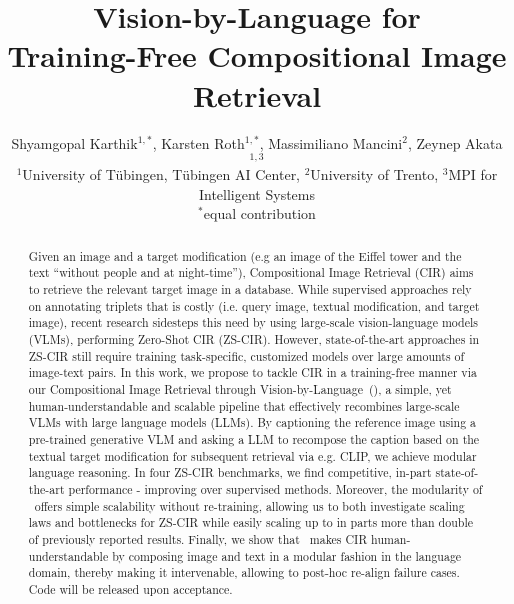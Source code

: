 \documentclass{article} \usepackage{iclr2024_conference,times}
\title{Vision-by-Language for \\Training-Free Compositional Image Retrieval}
\author{Shyamgopal Karthik$^{1,*}$, Karsten Roth$^{1,*}$, Massimiliano Mancini$^{2}$, Zeynep Akata$^{1, 3}$\\
\small{$^{1}$University of Tübingen, Tübingen AI Center, $^{2}$University of Trento, $^{3}$MPI for Intelligent Systems}\\
\small{$^*$equal contribution}
}
\newcommand{\acronym}{{Compositional Image Retrieval through Vision-by-Language}}
\begin{document}
\maketitle



\begin{abstract}
Given an image and a target modification (e.g an image of the Eiffel tower and the text ``without people and at night-time''), Compositional Image Retrieval (CIR) aims to retrieve the relevant target image in a database. While supervised approaches rely on annotating triplets that is costly (i.e. query image, textual modification, and target image), recent research sidesteps this need by using large-scale vision-language models (VLMs), performing Zero-Shot CIR (ZS-CIR). However, state-of-the-art approaches in ZS-CIR still require training task-specific, customized models over large amounts of image-text pairs. In this work, we propose to tackle CIR in a training-free manner via our \acronym\ (\methodNameNS), a simple, yet human-understandable and scalable pipeline that effectively recombines large-scale VLMs with large language models (LLMs). By captioning the reference image using a pre-trained generative VLM and asking a LLM to recompose the caption based on the textual target modification for subsequent retrieval via e.g. CLIP, we achieve modular language reasoning. In four ZS-CIR benchmarks, we find competitive, in-part state-of-the-art performance - improving over supervised methods. Moreover, the modularity of \methodNameNS\ offers simple scalability without re-training, allowing us to both investigate scaling laws and bottlenecks for ZS-CIR while easily scaling up to in parts more than double of previously reported results.  Finally, we show that \methodNameNS\ makes CIR human-understandable by composing image and text in a modular fashion in the language domain, thereby making it intervenable, allowing to post-hoc re-align failure cases. Code will be released upon acceptance.
\end{abstract}
\end{document}
